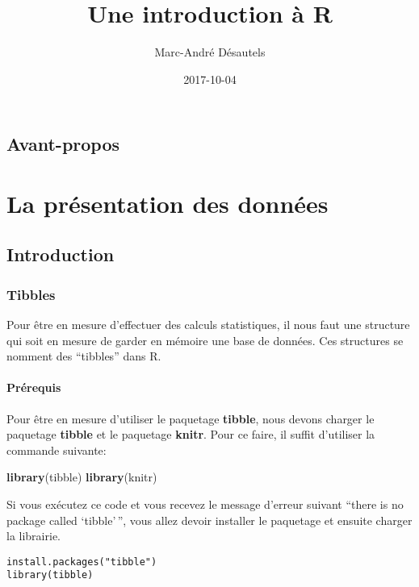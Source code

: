 \documentclass[]{book}
\title{Une introduction à R}
\author{Marc-André Désautels}
\date{2017-10-04}
\newenvironment{Shaded}{\begin{snugshade}}{\end{snugshade}}
\newcommand{\KeywordTok}[1]{\textcolor[rgb]{0.13,0.29,0.53}{\textbf{#1}}}
\newcommand{\NormalTok}[1]{#1}
\begin{document}
\maketitle

{
\setcounter{tocdepth}{1}
\tableofcontents
}
\chapter*{Avant-propos}\label{avant-propos}

\part{La présentation des
données}\label{part-la-presentation-des-donnees}

\chapter{Introduction}\label{intro}

\section{Tibbles}\label{tibbles}

Pour être en mesure d'effectuer des calculs statistiques, il nous faut
une structure qui soit en mesure de garder en mémoire une base de
données. Ces structures se nomment des ``tibbles'' dans R.

\subsection{Prérequis}\label{prerequis}

Pour être en mesure d'utiliser le paquetage \textbf{tibble}, nous devons
charger le paquetage \textbf{tibble} et le paquetage \textbf{knitr}.
Pour ce faire, il suffit d'utiliser la commande suivante:

\begin{Shaded}
\begin{Highlighting}[]
\KeywordTok{library}\NormalTok{(tibble)}
\KeywordTok{library}\NormalTok{(knitr)}
\end{Highlighting}
\end{Shaded}

Si vous exécutez ce code et vous recevez le message d'erreur suivant
``there is no package called `tibble'\,'', vous allez devoir installer
le paquetage et ensuite charger la librairie.

\begin{verbatim}
install.packages("tibble")
library(tibble)
\end{verbatim}
\end{document}
